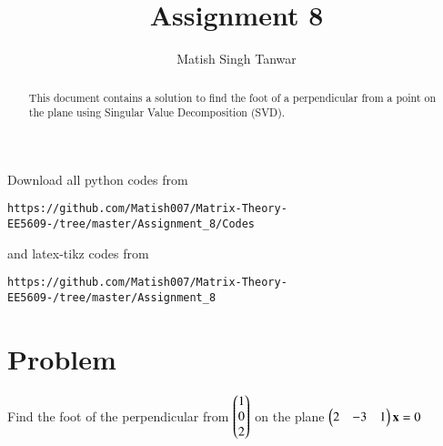 \documentclass[journal,12pt,twocolumn]{IEEEtran}
\begin{document}
 \vspace{3cm}
 \title{Assignment 8}
 \author{Matish Singh Tanwar}
 \maketitle
 \newpage
 \bigskip
 \renewcommand{\thetable}{\theenumi}
\vspace{1.0cm}
\begin{abstract}
This document contains a solution to find the foot of a perpendicular from a point on the plane using Singular Value Decomposition (SVD).
\end{abstract}
\vspace{0.5cm}
%
Download all python codes from 
\begin{lstlisting}
https://github.com/Matish007/Matrix-Theory-EE5609-/tree/master/Assignment_8/Codes
\end{lstlisting}
%
and latex-tikz codes from 
\begin{lstlisting}
https://github.com/Matish007/Matrix-Theory-EE5609-/tree/master/Assignment_8
\end{lstlisting}
%
%
\vspace{0.5mm}
\section{Problem}
Find the foot of the perpendicular from $\begin{pmatrix}1\\0\\2\end{pmatrix}$ on the plane $\begin{pmatrix}2&-3&1\end{pmatrix}\mathbf{x}=0$
\end{document}
